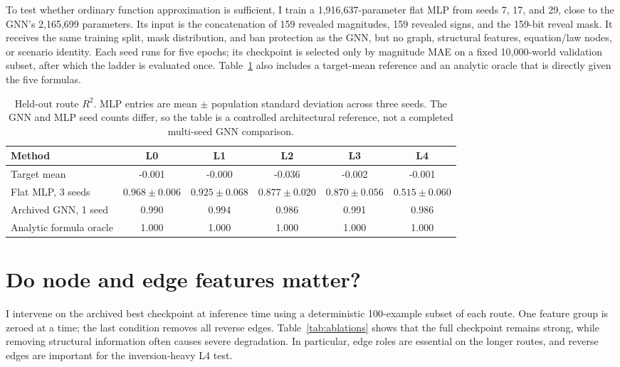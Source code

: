 \documentclass[10pt]{article}
\begin{document}
To test whether ordinary function approximation is sufficient, I train a 1,916,637-parameter flat MLP from seeds 7, 17, and 29, close to the GNN's 2,165,699 parameters. Its input is the concatenation of 159 revealed magnitudes, 159 revealed signs, and the 159-bit reveal mask. It receives the same training split, mask distribution, and ban protection as the GNN, but no graph, structural features, equation/law nodes, or scenario identity. Each seed runs for five epochs; its checkpoint is selected only by magnitude MAE on a fixed 10,000-world validation subset, after which the ladder is evaluated once. Table~\ref{tab:baselines} also includes a target-mean reference and an analytic oracle that is directly given the five formulas.

\begin{table}[H]
\centering\small
\setlength{\tabcolsep}{5pt}
\begin{tabular}{lccccc}
\toprule
Method & L0 & L1 & L2 & L3 & L4\\
\midrule
Target mean & -0.001 & -0.000 & -0.036 & -0.002 & -0.001\\
Flat MLP, 3 seeds & $0.968\pm0.006$ & $0.925\pm0.068$ & $0.877\pm0.020$ & $0.870\pm0.056$ & $0.515\pm0.060$\\
Archived GNN, 1 seed & 0.990 & 0.994 & 0.986 & 0.991 & 0.986\\
Analytic formula oracle & 1.000 & 1.000 & 1.000 & 1.000 & 1.000\\
\bottomrule
\end{tabular}
\caption{Held-out route $R^2$. MLP entries are mean $\pm$ population standard deviation across three seeds. The GNN and MLP seed counts differ, so the table is a controlled architectural reference, not a completed multi-seed GNN comparison.}
\label{tab:baselines}
\end{table}

\section{Do node and edge features matter?}

I intervene on the archived best checkpoint at inference time using a deterministic 100-example subset of each route. One feature group is zeroed at a time; the last condition removes all reverse edges. Table~\ref{tab:ablations} shows that the full checkpoint remains strong, while removing structural information often causes severe degradation. In particular, edge roles are essential on the longer routes, and reverse edges are important for the inversion-heavy L4 test.
\end{document}
